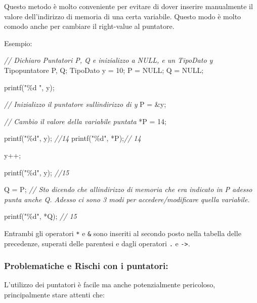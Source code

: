 \documentclass[
]{article}
\newenvironment{Shaded}{}{}
\newcommand{\CommentTok}[1]{\textcolor[rgb]{0.38,0.63,0.69}{\textit{#1}}}
\newcommand{\DecValTok}[1]{\textcolor[rgb]{0.25,0.63,0.44}{#1}}
\newcommand{\NormalTok}[1]{#1}
\newcommand{\StringTok}[1]{\textcolor[rgb]{0.25,0.44,0.63}{#1}}
\begin{document}
Questo metodo è molto conveniente per evitare di dover inserire
manualmente il valore dell'indirizzo di memoria di una certa variabile.
Questo modo è molto comodo anche per cambiare il right-value al
puntatore.

Esempio:

\begin{Shaded}
\begin{Highlighting}[]
\CommentTok{// Dichiaro Puntatori P, Q e inizializzo a NULL, e un TipoDato y}
\NormalTok{Tipopuntatore P, Q;}
\NormalTok{TipoDato y = }\DecValTok{10}\NormalTok{;}
\NormalTok{P = NULL;}
\NormalTok{Q = NULL;}

\NormalTok{printf(}\StringTok{"\%d "}\NormalTok{, y);}

\CommentTok{// Inizializzo il puntatore sull\textquotesingle{}indirizzo di y}
\NormalTok{P = \&y; }

\CommentTok{// Cambio il valore della variabile puntata}
\NormalTok{*P = }\DecValTok{14}\NormalTok{;}

\NormalTok{printf(}\StringTok{"\%d"}\NormalTok{, y); }\CommentTok{//14}
\NormalTok{printf(}\StringTok{"\%d"}\NormalTok{, *P);}\CommentTok{// 14}

\NormalTok{y++;}

\NormalTok{printf(}\StringTok{"\%d"}\NormalTok{, y); }\CommentTok{//15}

\NormalTok{Q = P; }
\CommentTok{// Sto dicendo che all\textquotesingle{}indirizzo di memoria che era indicato in P adesso punta anche Q. Adesso ci sono 3 modi per accedere/modificare quella variabile.}

\NormalTok{printf(}\StringTok{"\%d"}\NormalTok{, *Q); }\CommentTok{// 15}
\end{Highlighting}
\end{Shaded}

Entrambi gli operatori \texttt{*} e \texttt{\&} sono inseriti al secondo
posto nella tabella delle precedenze, superati delle parentesi e dagli
operatori \texttt{.} e \texttt{-\textgreater{}}.

\hypertarget{header-n681}{%
\subsubsection{\texorpdfstring{Problematiche e Rischi con i puntatori:
}{Problematiche e Rischi con i puntatori: }}\label{header-n681}}

L'utilizzo dei puntatori è facile ma anche potenzialmente pericoloso,
principalmente stare attenti che:
\end{document}
